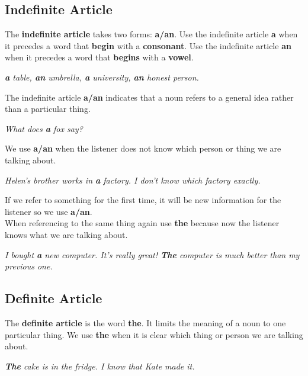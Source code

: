 \documentclass[10pt,a4paper]{article}
\begin{document}
\subsection{Indefinite Article}
The \textbf{indefinite article} takes two forms: \textbf{a/an}. Use the indefinite article \textbf{a} when it precedes a word that \textbf{begin} with a \textbf{consonant}. Use the indefinite article \textbf{an} when it precedes a word that \textbf{begins} with a \textbf{vowel}.
\begin{center}
		\textit{ \textbf{a} table, \textbf{an} umbrella, \textbf{a} university, \textbf{an} honest person.}
\end{center}
The indefinite article \textbf{a/an} indicates that a noun refers to a general idea rather than a particular thing.
\begin{center}
\textit{What does \textbf{a} fox say?}
\end{center}
We use \textbf{a/an} when the listener does not know which person or thing we are talking about.
\begin{center}
		\textit{Helen's brother works in \textbf{a} factory. I don't know which factory exactly.}
\end{center}
\newpage
If we refer to something for the first time, it will be new information for the listener so we use \textbf{a/an}.\\
When referencing to the same thing again use \textbf{the} because now the listener knows what we are talking about.
\begin{center}
\textit{I bought \textbf{a} new computer. It's really great! \textbf{The} computer is much better than my previous one.}
\end{center}

\subsection{Definite Article}
The \textbf{definite article} is the word \textbf{the}. It limits the meaning of a noun to one particular thing. We use \textbf{the} when it is clear which thing or person we are talking about.
\begin{center}
\textit{ \textbf{The} cake is in the fridge. I know that Kate made it.}
\end{center}
\end{document}
